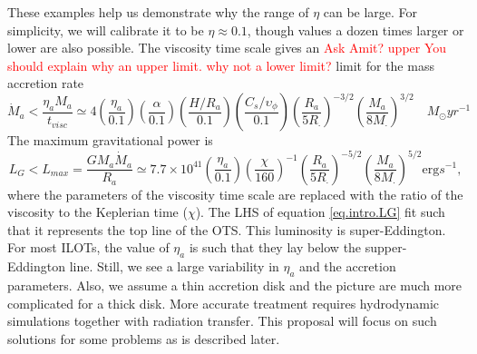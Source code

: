 \documentclass[a4paper,modern]{aastex62}
\newcommand{\tred}[1]{\textcolor{red}{#1}}
\begin{document}
These examples help us demonstrate why the range of $\eta$ can be large.
For simplicity, we will calibrate it to be $\eta \approx 0.1$, though values a dozen times larger or lower are also possible.
The viscosity time scale gives an 
\tred{Ask Amit? upper You should explain why an upper limit. why not a lower limit? } 
limit for the mass accretion rate
\begin{equation}
\dot M_a < \frac{\eta_a M_a}{t_{visc}} \simeq 4\left(\frac{\eta_a}{0.1}\right) \left(\frac{\alpha}{0.1}\right) \left(\frac{H/R_a}{0.1}\right) \left(\frac{C_s/\upsilon_\phi}{0.1}\right) \left(\frac{R_a}{5R_\cdot}\right)^{-3/2} \left(\frac{M_a}{8M_\cdot}\right)^{3/2} \quad M_\odot yr^{-1}
\end{equation}
The maximum gravitational power is
\begin{equation}\label{eq.intro.LG}
L_G<L_{max} = \frac{GM_a\dot M_a}{R_a} \simeq 7.7 \times 10^{41}\left(\frac{\eta_a}{0.1}\right) \left(\frac{\chi}{160}\right)^{-1} \left(\frac{R_a}{5 R_\cdot}\right)^{-5/2} \left( \frac{M_a}{8 M_\cdot}\right)^{5/2} \text{erg} s^{-1},
\end{equation}
where the parameters of the viscosity time scale are replaced with the ratio of the viscosity to the Keplerian time ($\chi$). 
The LHS of equation \ref{eq.intro.LG} fit such that it represents the top line of the OTS.
This luminosity is super-Eddington. 
For most ILOTs, the value of $\eta_a$ is such that they lay below the supper-Eddington line. 
Still, we see a large variability in $\eta_a$ and the accretion parameters. 
Also, we assume a thin accretion disk and the picture are much more complicated for a thick disk. 
More accurate treatment requires hydrodynamic simulations together with radiation transfer. 
This proposal will focus on such solutions for some problems as is described later. 
\end{document}
